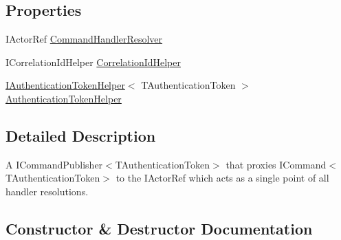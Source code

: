 \subsection*{Properties}
\begin{DoxyCompactItemize}
\item 
I\+Actor\+Ref \hyperlink{classCqrs_1_1Akka_1_1Commands_1_1AkkaCommandBusProxy_afab0340ffb172da48584dce148f3defd_afab0340ffb172da48584dce148f3defd}{Command\+Handler\+Resolver}
\item 
I\+Correlation\+Id\+Helper \hyperlink{classCqrs_1_1Akka_1_1Commands_1_1AkkaCommandBusProxy_aa554035c12060c7eedb0b982ac490da8_aa554035c12060c7eedb0b982ac490da8}{Correlation\+Id\+Helper}
\item 
\hyperlink{interfaceCqrs_1_1Authentication_1_1IAuthenticationTokenHelper}{I\+Authentication\+Token\+Helper}$<$ T\+Authentication\+Token $>$ \hyperlink{classCqrs_1_1Akka_1_1Commands_1_1AkkaCommandBusProxy_a6faae6227f1da33928e54a775466f9c9_a6faae6227f1da33928e54a775466f9c9}{Authentication\+Token\+Helper}
\end{DoxyCompactItemize}


\subsection{Detailed Description}
A I\+Command\+Publisher$<$\+T\+Authentication\+Token$>$ that proxies I\+Command$<$\+T\+Authentication\+Token$>$ to the I\+Actor\+Ref which acts as a single point of all handler resolutions. 



\subsection{Constructor \& Destructor Documentation}
\mbox{\label{classCqrs_1_1Akka_1_1Commands_1_1AkkaCommandBusProxy_ad9a3fa7aa546bc2c398d4f52d0659656_ad9a3fa7aa546bc2c398d4f52d0659656}} 
